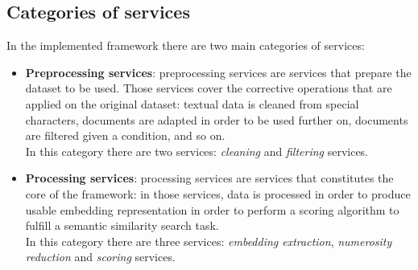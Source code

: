 \documentclass[\main/main.tex]{subfiles}
\begin{document}
\subsection{Categories of services}
In the implemented framework there are two main categories of services:
\begin{itemize}
    \item \textbf{Preprocessing services}: preprocessing services are services that prepare the dataset to be used. Those services cover the corrective operations that are applied on the original dataset: textual data is cleaned from special characters, documents are adapted in order to be used further on, documents are filtered given a condition, and so on.  \\
    In this category there are two services: \emph{cleaning} and \emph{filtering} services.
    \item \textbf{Processing services}: processing services are services that constitutes the core of the framework: in those services, data is processed in order to produce usable embedding representation in order to perform a scoring algorithm to fulfill a semantic similarity search task. \\
    In this category there are three services: \emph{embedding extraction}, \emph{numerosity reduction} and \emph{scoring} services.
\end{itemize}
\end{document}
